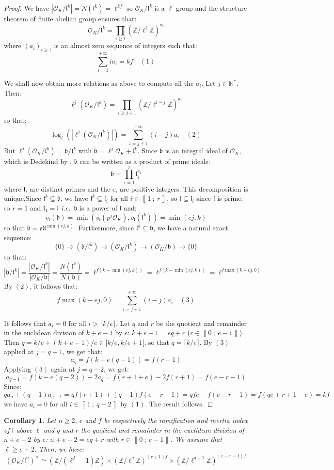 \documentclass[a4paper,10pt]{report}
\theoremstyle{definition}
\theoremstyle{plain}
\newtheorem{corollary}[definition]{Corollary}
\theoremstyle{definition}
\newcommand{\ie}{\emph{i.e.}\ }
\newcommand{\N}{\mathbb{N}}
\newcommand{\Z}{\mathbb{Z}}
\newcommand{\mO}{\mathcal{O}}
\renewcommand{\i}[2]{\left\llbracket #1~;~#2\right\rrbracket}
\renewcommand{\(}{\left(}
\renewcommand{\)}{\right)}
\newcommand{\mf}[1]{\mathfrak{#1}}
\begin{document}
\begin{proof}
We have $|\mO_K/\mf{l}^k|=N(\mf{l}^k)=\ell^{kf}$ so $\mO_K/\mf{l}^k$ is a $\ell$-group and the structure theorem of finite abelian group ensures that:
\[\mO_K/\mf{l}^k=\prod_{i\geq 1}(\Z/\ell^i\Z)^{a_i}\]
where $(a_i)_{i\geq 1}$ is an almost zero sequence of integers such that:
\[\sum_{i=1}^{+\infty} ia_i=kf\quad (1)\]

We shall now obtain more relations as above to compute all the $a_i$. Let $j\in\N^*$. Then:
\[\ell^j(\mO_K/\mf{l}^k)=\prod_{i\geq j+1}(\Z/\ell^{i-j}\Z)^{a_i}\]
so that:
\[\log_{\ell}(|\ell^j(\mO_K/\mf{l}^k)|)=\sum_{i=j+1}^{+\infty} (i-j)a_i\quad (2)\]
But $\ell^j(\mO_K/\mf{l}^k)=\mf{b}/\mf{l}^k$ with $\mf{b}=\ell^j\mO_K+\mf{l}^k$. Since $\mf{b}$ is an integral ideal of $\mO_K$, which is Dedekind by \cite[corollary 5.6]{Cox}, $\mf{b}$ can be written as a product of prime ideals:
\[\mf{b}=\prod_{i=1}^r\mf{l}_i^{e_i}\]
where $\mf{l}_i$ are distinct primes and the $e_i$ are positive integers. This decomposition is unique.Since $\mf{l}^k\subseteq \mf{b}$, we have $\mf{l}^k\subseteq\mf{l}_i$ for all $i\in\i{1}{r}$, so  $\mf{l}\subseteq\mf{l}_i$ since $\mf{l}$ is prime, so $r=1$ and $\mf{l}_1=\mf{l}$ \ie $\mf{b}$ is a power of $\mf{l}$ and:
\[v_{\mf{l}}(\mf{b})=\min(v_{\mf{l}}(p^j\mO_K),v_{\mf{l}}(\mf{l}^k))=\min(ej,k)\]
so that $\mf{b}=\mf{ell}^{\min(ej,k)}$. Furthermore, since $\mf{l}^k\subseteq \mf{b}$, we have a natural exact sequence:
\[\{0\}\longrightarrow(\mf{b}/\mf{l}^k)\longrightarrow (\mO_K/\mf{l}^k)\longrightarrow (\mO_K/\mf{b}) \longrightarrow \{0\}\]
so that:
\[|\mf{b}/\mf{l}^k|=\frac{|\mO_K/\mf{l}^k|}{|\mO_K/\mf{b}|}=\frac{N(\mf{l}^k)}{N(\mf{b})}=\ell^{f(k-\min(ej,k))}=\ell^{f(k-\min(ej,k))}=\ell^{f\max(k-ej,0)}\]
By $(2)$, it follows that:
\[f\max(k-ej,0)=\sum_{i=j+1}^{+\infty} (i-j)a_i \quad (3)\]

It follows that $a_i=0$ for all $i>\lceil k/e\rceil$. Let $q$ and $r$ be the quotient and remainder in the euclidean division of $k+e-1$ by $e$: $k+e-1=eq+r$ ($r\in\i{0}{e-1}$). Then $q=k/e+(k+e-1)/e\in[k/e,k/e+1[$, so that $q=\lceil k/e\rceil$.  By $(3)$ applied at $j=q-1$, we get that:
\[a_q=f(k-e(q-1))=f(r+1)\]
Applying $(3)$ again at $j=q-2$, we get:
\[a_{q-1}=f(k-e(q-2))-2a_q=f(r+1+e)-2f(r+1)=f(e-r-1)\]
Since:
\[qa_q+(q-1)a_{q-1}=qf(r+1)+(q-1)f(e-r-1)=qfe-f(e-r-1)=f(qe+r+1-e)=kf\]
we have $a_i=0$ for all $i\in\i{1}{q-2}$ by $(1)$. The result follows.
\end{proof}

\begin{corollary}
Let $n\geq 2$, $e$ and $f$ be respectively the ramification and inertia index of $\mf{l}$ above $\ell$ and $q$ and $r$ the quotient and remainder in the euclidean division of $n+e-2$ by $e$: $n+e-2=eq+r$ with $r\in\i{0}{e-1}$. We assume that $\ell\geq e+2$. Then, we have:
\[(\mO_K/\mf{l}^n)^\times\simeq (\Z/(\ell^f-1)\Z)\times (\Z/\ell^q\Z)^{(r+1)f}\times(\Z/\ell^{q-1}\Z)^{(e-r-1)f}\]
\end{corollary}
\end{document}
